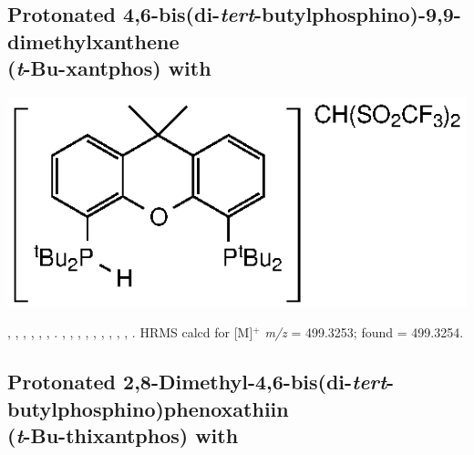 \subsection*{Protonated 4,6-bis(di-\emph{tert}-butylphosphino)-9,9-dimethylxanthene\\(\emph{t}-Bu-xantphos) with }

\begin{structure}[h]
\begin{center}
\includegraphics{../Structures/CtBuH.eps}
\end{center}
\end{structure}



, 
,
,
, ,
,
.
,
,
,
,
,
,
,
,
,
.
HRMS calcd for  [M]$^+$ \emph{m/z} = 499.3253; found = 499.3254.



\subsection*{Protonated 2,8-Dimethyl-4,6-bis(di-\emph{tert}-butylphosphino)phenoxathiin \\(\emph{t}-Bu-thixantphos) with }

